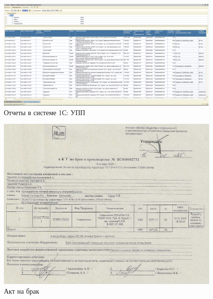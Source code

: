 \begin{figure}
\begin{center}
 \includegraphics[height=0.3\textheight, keepaspectratio]{Pics/VIIIотчет3.png}
\end{center}
 \caption{Отчеты в системе 1С: УПП}
 \label{pic:/VIIIотчет3}
\end{figure}

\begin{figure}
\begin{center}
 \includegraphics[height=0.5\textheight, keepaspectratio]{Pics/VIII.11..jpg}
\end{center}
 \caption{Акт на брак}
 \label{pic:/VIII.11.}
\end{figure}

